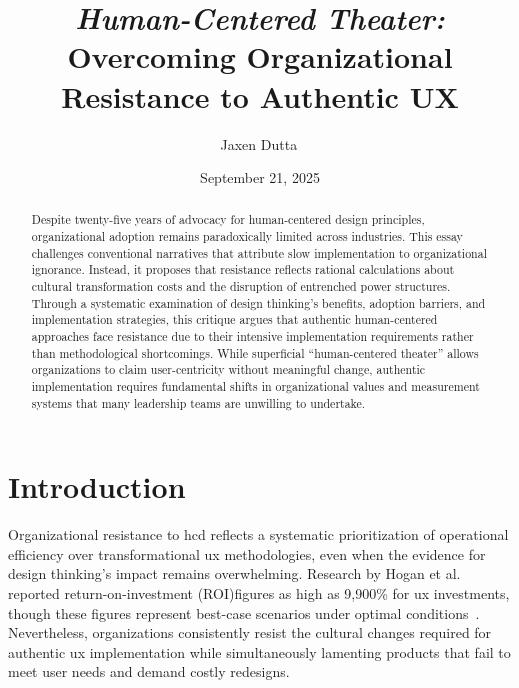 \documentclass[11pt,showkeys]{essay}
\begin{document}
\title{\textit{Human-Centered Theater:}\\
Overcoming Organizational Resistance to Authentic UX}

\author{Jaxen Dutta\, }

\date{September 21, 2025}

\begin{abstract}
Despite twenty-five years of advocacy for human-centered design principles, organizational adoption remains paradoxically limited across industries. This essay challenges conventional narratives that attribute slow implementation to organizational ignorance. Instead, it proposes that resistance reflects rational calculations about cultural transformation costs and the disruption of entrenched power structures. Through a systematic examination of design thinking's benefits, adoption barriers, and implementation strategies, this critique argues that authentic human-centered approaches face resistance due to their intensive implementation requirements rather than methodological shortcomings. While superficial ``human-centered theater'' allows organizations to claim user-centricity without meaningful change, authentic implementation requires fundamental shifts in organizational values and measurement systems that many leadership teams are unwilling to undertake.
\end{abstract}


\maketitle

\section{Introduction}

Organizational resistance to \gls{hcd} reflects a systematic prioritization of operational efficiency over transformational \gls{ux} methodologies, even when the evidence for design thinking's impact remains overwhelming. Research by Hogan et al. reported return-on-investment (ROI)figures as high as 9,900\% for \gls{ux} investments, though these figures represent best-case scenarios under optimal conditions~\cite{hogan_six_2016}. Nevertheless, organizations consistently resist the cultural changes required for authentic \gls{ux} implementation while simultaneously lamenting products that fail to meet user needs and demand costly redesigns.
\end{document}
